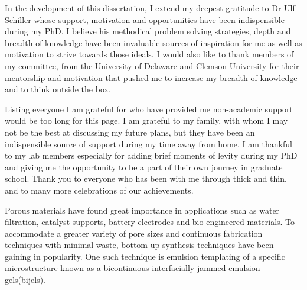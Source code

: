 \begin{front} %


In the development of this dissertation, I extend my deepest gratitude to Dr Ulf Schiller whose support, motivation and 
opportunities have been indispensible during my PhD. I believe his methodical problem solving strategies, depth and 
breadth of knowledge have been invaluable sources of inspiration for me as well as 
motivation to strive towards those ideals. I would also like to thank members of my committee, 
from the University of Delaware and Clemson University for their mentorship 
and motivation that pushed me to increase my breadth of knowledge and to think outside the box.

Listing everyone I am grateful for who have provided me non-academic support would be too long for this page. 
I am grateful to my family, with whom I may not be the best at 
discussing my future plans, but they have been an indispensible source of support during my time away from home. 
I am thankful to my lab members especially for adding brief moments of levity during my PhD and giving me the 
opportunity to be a part of their own journey in graduate school. Thank you to everyone who has been with me 
through thick and thin, and to many more celebrations of our achievements. 




\maketocloflot


Porous materials have found great importance in applications such as water filtration, catalyst supports, battery 
electrodes and bio engineered materials. To accommodate a greater variety of pore sizes and continuous fabrication 
techniques with minimal waste, bottom up synthesis techniques have been gaining in popularity. One such technique is
emulsion templating of a specific microstructure known as a bicontinuous interfacially jammed emulsion gels(bijels). 


\end{front}
